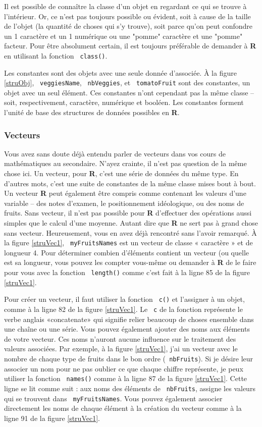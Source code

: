 \documentclass[10.5pt,a4paper]{article}
\newcommand{\rcode}[1]{\texttt{\color{rstudio} #1}}
\begin{document}
    Il est possible de connaître la classe d'un objet en regardant ce qui se trouve à l'intérieur. Or, ce n'est pas toujours possible ou évident, soit à cause de la taille de l'objet (la quantité de choses qui s'y trouve), soit parce qu'on peut confondre un 1 caractère et un 1 numérique ou une "pomme" caractère et une "pomme" facteur. Pour être absolument certain, il est toujours préférable de demander à \textbf{R} en utilisant la fonction \rcode{class()}.
    
    Les constantes sont des objets avec une seule donnée d'associée. À la figure \ref{struObj}, \rcode{veggiesName}, \rcode{nbVeggies}, et \rcode{tomatoFruit} sont des constantes, un objet avec un seul élément. Ces constantes n'ont cependant pas la même classe -- soit, respectivement, caractère, numérique et booléen. Les constantes forment l'unité de base des structures de données possibles en \textbf{R}.
    
    \subsubsection{Vecteurs}\label{vec}
    Vous avez sans doute déjà entendu parler de vecteurs dans vos cours de mathématiques au secondaire. N'ayez crainte, il n'est pas question de la même chose ici. Un vecteur, pour \textbf{R}, c'est une série de données du même type. En d'autres mots, c'est une suite de constantes de la même classe mises bout à bout. Un vecteur \textbf{R} peut également être compris comme contenant les valeurs d'une variable -- des notes d'examen, le positionnement idéologique, ou des noms de fruits. Sans vecteur, il n'est pas possible pour \textbf{R} d'effectuer des opérations aussi simples que le calcul d'une moyenne. Autant dire que \textbf{R} ne sert pas à grand chose sans vecteur. Heureusement, vous en avez déjà rencontré sans l'avoir remarqué. À la figure \ref{struVec1}, \rcode{myFruitsNames} est un vecteur de classe « caractère » et de longueur 4. Pour déterminer combien d'éléments contient un vecteur (ou quelle est sa longueur, vous pouvez les compter vous-même ou demander à \textbf{R} de le faire pour vous avec la fonction \rcode{length()} comme c'est fait à la ligne 85 de la figure \ref{struVec1}. 
    
    Pour créer un vecteur, il faut utiliser la fonction \rcode{c()} et l'assigner à un objet, comme à la ligne 82 de la figure \ref{struVec1}. Le \rcode{c} de la fonction représente le verbe anglais «concatenate» qui signifie relier beaucoup de choses ensemble dans une chaîne ou une série. Vous pouvez également ajouter des noms aux éléments de votre vecteur. Ces noms n'auront aucune influence sur le traitement des valeurs associées. Par exemple, à la figure \ref{struVec1}, j'ai un vecteur avec le nombre de chaque type de fruits dans le bon ordre (\rcode{nbFruits}). Si je désire leur associer un nom pour ne pas oublier ce que chaque chiffre représente, je peux utiliser la fonction \rcode{names()} comme à la ligne 87 de la figure \ref{struVec1}. Cette ligne se lit comme suit : aux noms des éléments de \rcode{nbFruits}, assigne les valeurs qui se trouvent dans \rcode{myFruitsNames}. Vous pouvez également associer directement les noms de chaque élément à la création du vecteur comme à la ligne 91 de la figure \ref{struVec1}. 
    
\end{document}
